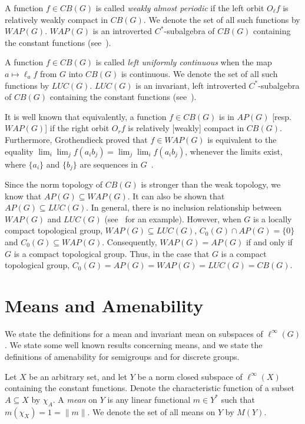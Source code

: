 A function $f\in CB(G)$ is called {\it weakly almost periodic} if the left
orbit $O_\ell f$ is relatively weakly compact in $CB(G)$.  We denote the set
of all such functions by $WAP(G)$.  $WAP(G)$ is an
introverted $C^*$-subalgebra of $CB(G)$ containing the constant functions
(see~\cite[Theorems 4.2 and 12.1]{eberlein}).

A function $f\in CB(G)$ is called {\it left uniformly continuous}
when the map $a\mapsto \ell_a f$ from $G$ into $CB(G)$ is continuous.
We denote the set of all such functions by $LUC(G)$.
$LUC(G)$ is an invariant, left introverted $C^*$-subalgebra
of $CB(G)$ containing the constant functions (see~\cite[pp. 64, 68, 72]{namioka}).

It is well known that equivalently, a function $f\in CB(G)$ is in
$AP(G)$ [resp. $WAP(G)$] if the right orbit $O_r f$ is relatively [weakly]
compact in $CB(G)$. Furthermore, Grothendieck proved that $f\in WAP(G)$ is equivalent to
the equality
$\lim_i \lim_j f(a_i b_j) = \lim_j \lim_i f(a_i b_j)$, whenever the limits exist,
where $\{a_i\}$ and $\{b_j\}$ are sequences in $G$~\cite{groth}.

Since the norm topology of $CB(G)$ is stronger than the weak topology, we know that $AP(G) \subseteq WAP(G)$.
It can also be shown that $AP(G) \subseteq LUC(G)$.
In general, there is no inclusion relationship between $WAP(G)$ and $LUC(G)$
(see~\cite[p.165]{milnes} for an example).
However, when $G$ is a locally compact topological group, $WAP(G)\subseteq LUC(G)$,
$C_0(G)\cap AP(G) = \{0\}$ and $C_0(G)\subseteq WAP(G)$.  Consequently,
$WAP(G) = AP(G)$ if and only if $G$ is a compact topological group.
Thus, in the case that $G$ is a compact topological group, $C_0(G) = AP(G) = WAP(G) = LUC(G) = CB(G)$.

\section{Means and Amenability}
We state the definitions for a mean and invariant mean on subspaces of $\ell^\infty(G)$.
We state some well known results concerning means, and we state the definitions of amenability
for semigroups and for discrete groups.

Let $X$ be an arbitrary set, and let $Y$ be a norm closed subspace of $\ell^\infty(X)$ containing the constant functions.
Denote the characteristic function of a subset $A\subseteq X$ by $\chi_A$.
A {\it mean} on $Y$ is any linear functional $m\in Y^*$ such that $m(\chi_X) = 1 = \|m\|$.
We denote the set of all means on $Y$ by $M(Y)$.

